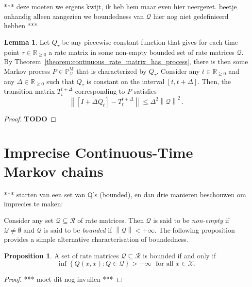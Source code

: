 \documentclass[10pt]{paper}
\theoremstyle{definition}
\newtheorem{proposition}[theorem]{Proposition}
\newtheorem{lemma}[theorem]{Lemma}
\newcommand{\reals}{\mathbb{R}}
\newcommand{\realsnonneg}{\reals_{\geq 0}}
\newcommand{\states}{\mathcal{X}}
\newcommand{\processes}{\mathbb{P}}
\newcommand{\mprocesses}{\processes^{\mathrm{M}}}
\newcommand{\rateset}{\mathcal{Q}}
\newcommand{\norm}[1]{\left\lVert #1 \right\rVert}
\begin{document}
*** deze moeten we ergens kwijt, ik heb hem maar even hier neergezet. beetje onhandig alleen aangezien we boundedness van $\rateset$ hier nog niet gedefinieerd hebben ***

\begin{lemma}\label{lemma:bound_precise_linear_approx}
Let $Q_\tau$ be any piecewise-constant function that gives for each time point $\tau\in\realsnonneg$ a rate matrix in some non-empty bounded set of rate matrices $\rateset$. By Theorem~\ref{theorem:continuous_rate_matrix_has_process}, there is then some Markov process $P\in\mprocesses_\rateset$ that is characterized by $Q_\tau$. Consider any $t\in\realsnonneg$ and any $\Delta\in\realsnonneg$ such that $Q_\tau$ is constant on the interval $[t,t+\Delta]$. Then, the transition matrix $T_t^{t+\Delta}$ corresponding to $P$ satisfies
\begin{equation*}
\norm{\left[I + \Delta Q_t\right] - T_t^{t+\Delta}} \leq \Delta^2\norm{\rateset}^2\,.
\end{equation*}
\end{lemma}
\begin{proof}
{\bf TODO}
\end{proof}

\section{Imprecise Continuous-Time Markov chains}
\label{sec:iCTMC}

*** starten van een set van Q's (bounded), en dan drie manieren beschouwen om imprecies te maken:

Consider any set $\rateset\subseteq\mathcal{R}$ of rate matrices. Then $\rateset$ is said to be \emph{non-empty} if $\rateset\neq\emptyset$ and $\rateset$ is said to be \emph{bounded} if $\norm{\rateset}<+\infty$. The following proposition provides a simple alternative characterisation of boundedness.

\begin{proposition}\label{prop:alternativedefforbounded}
A set of rate matrices $\rateset\subseteq\mathcal{R}$ is bounded if and only if
\begin{equation*}
\inf\left\{Q(x,x)\colon Q\in\rateset\right\}>-\infty\text{~~for all $x\in\states$.}
\end{equation*}
\end{proposition}
\begin{proof}
*** moet dit nog invullen ***
\end{proof}
\end{document}
